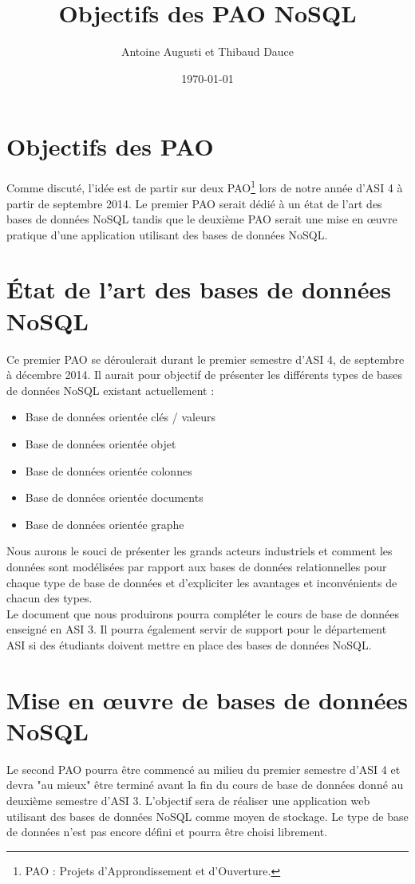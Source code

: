 \documentclass[a4paper, 12pt, french]{article}
\title{Objectifs des PAO NoSQL}
\author{Antoine Augusti et Thibaud Dauce}
\date{\today}
\begin{document}
	\maketitle

	\section{Objectifs des PAO}
		Comme discuté, l'idée est de partir sur deux PAO\footnote{PAO : Projets d'Approndissement et d'Ouverture.} lors de notre année d'ASI 4 à partir de septembre 2014. Le premier PAO serait dédié à un état de l'art des bases de données NoSQL tandis que le deuxième PAO serait une mise en œuvre pratique d'une application utilisant des bases de données NoSQL.

		\section{État de l'art des bases de données NoSQL}
		Ce premier PAO se déroulerait durant le premier semestre d'ASI 4, de septembre à décembre 2014. Il aurait pour objectif de présenter les différents types de bases de données NoSQL existant actuellement : 
		\vspace{10px}
		\begin{itemize}
			\item Base de données orientée clés / valeurs
			\item Base de données orientée objet
			\item Base de données orientée colonnes
			\item Base de données orientée documents
			\item Base de données orientée graphe
		\end{itemize}
		\vspace{10px}

		Nous aurons le souci de présenter les grands acteurs industriels et comment les données sont modélisées par rapport aux bases de données relationnelles pour chaque type de base de données et d'expliciter les avantages et inconvénients de chacun des types.\\

		Le document que nous produirons pourra compléter le cours de base de données enseigné en ASI 3. Il pourra également servir de support pour le département ASI si des étudiants doivent mettre en place des bases de données NoSQL.
	
	\section{Mise en œuvre de bases de données NoSQL}
		Le second PAO pourra être commencé au milieu du premier semestre d'ASI 4 et devra "au mieux" être terminé avant la fin du cours de base de données donné au deuxième semestre d'ASI 3. L'objectif sera de réaliser une application web utilisant des bases de données NoSQL comme moyen de stockage. Le type de base de données n'est pas encore défini et pourra être choisi librement.\\
\end{document}
